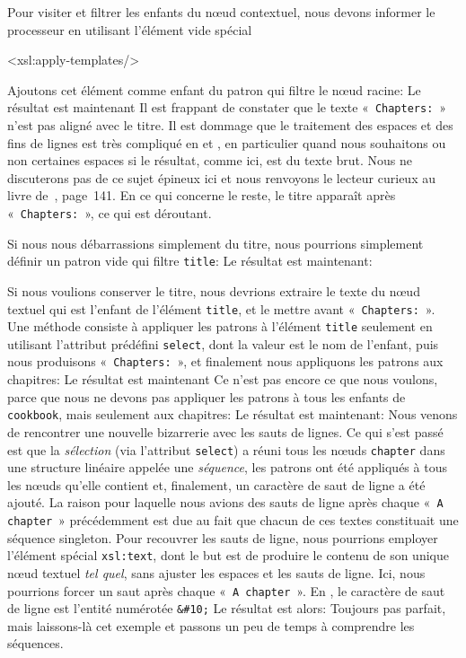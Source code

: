 Pour visiter et filtrer les enfants du nœud contextuel, nous
devons informer le processeur en utilisant l'élément vide spécial
\begin{sverb}
<xsl:apply-templates/>
\end{sverb}
Ajoutons cet élément comme enfant du patron qui filtre le nœud
racine: 
\noindent Le résultat est maintenant
\noindent Il est frappant de constater que le texte
«~\texttt{Chapters:}~» n'est pas aligné avec le titre. Il est dommage
que le traitement des espaces et des fins de lignes est très compliqué
en \XML et \XSLT, en particulier quand nous souhaitons ou non
certaines espaces si le résultat, comme ici, est du texte brut. Nous
ne discuterons pas de ce sujet épineux ici et nous renvoyons le
lecteur curieux au livre de~\cite{Kay_2008}, page~141. En ce qui
concerne le reste, le titre apparaît après «~\texttt{Chapters:}~», ce
qui est déroutant.

Si nous nous débarrassions simplement du titre, nous pourrions
simplement définir un patron vide qui filtre \texttt{title}:
\noindent Le résultat est maintenant:

Si nous voulions conserver le titre, nous devrions extraire le texte
du nœud textuel qui est l'enfant de l'élément \texttt{title}, et
le mettre avant «~\texttt{Chapters:}~». Une méthode consiste à appliquer
les patrons à l'élément \texttt{title} seulement en utilisant
l'attribut prédéfini \texttt{select}, dont la valeur est le nom de
l'enfant, puis nous produisons «~\texttt{Chapters:}~», et finalement
nous appliquons les patrons aux chapitres:
\noindent Le résultat est maintenant
\noindent Ce n'est pas encore ce que nous voulons, parce que nous ne
devons pas appliquer les patrons à tous les enfants de
\texttt{cookbook}, mais seulement aux chapitres:
\noindent Le résultat est maintenant:
\noindent Nous venons de rencontrer une nouvelle bizarrerie avec les
sauts de lignes. Ce qui s'est passé est que la \emph{sélection} (via
l'attribut \texttt{select}) a réuni tous les nœuds
\texttt{chapter} dans une structure linéaire appelée une
\emph{séquence}, les patrons ont été appliqués à tous les nœuds
qu'elle contient et, finalement, un caractère de saut de ligne a été
ajouté. La raison pour laquelle nous avions des sauts de ligne après
chaque «~\texttt{A chapter}~» précédemment est due au fait que chacun de
ces textes constituait une séquence singleton. Pour recouvrer les
sauts de ligne, nous pourrions employer l'élément spécial
\texttt{xsl:text}, dont le but est de produire le contenu de son
unique nœud textuel \emph{tel quel}, sans ajuster les espaces et
les sauts de ligne. Ici, nous pourrions forcer un saut après chaque
«~\texttt{A chapter}~». En \XML, le caractère de saut de ligne est
l'entité numérotée \verb|&#10;|
\noindent Le résultat est alors:
\noindent Toujours pas parfait, mais laissons-là cet exemple et
passons un peu de temps à comprendre les séquences.

